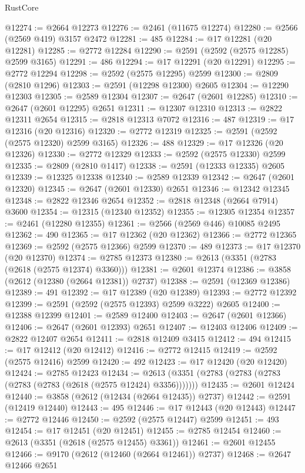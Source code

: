 \begin{lexlean}{RustCore}
\begin{coremodule}
@12274 := @2664 @12273
@12276 := @2461 (@11675 @12274)
@12280 := @2566 (@2569 @419) @3157 @2472
@12281 := 485
@12284 := @17 @12281 (@20 @12281)
@12285 := @2772 @12284
@12290 := @2591 (@2592 (@2575 @12285) @2599 @3165)
@12291 := 486
@12294 := @17 @12291 (@20 @12291)
@12295 := @2772 @12294
@12298 := @2592 (@2575 @12295) @2599
@12300 := @2809 (@2810 @1296)
@12303 := @2591 (@12298 @12300) @2605
@12304 := @12290 @12303
@12305 := @2589 @12304
@12307 := @2647 (@2601 @12285)
@12310 := @2647 (@2601 @12295) @2651
@12311 := @12307 @12310
@12313 := @2822 @12311 @2654
@12315 := @2818 @12313 @7072
@12316 := 487
@12319 := @17 @12316 (@20 @12316)
@12320 := @2772 @12319
@12325 := @2591 (@2592 (@2575 @12320) @2599 @3165)
@12326 := 488
@12329 := @17 @12326 (@20 @12326)
@12330 := @2772 @12329
@12333 := @2592 (@2575 @12330) @2599
@12335 := @2809 (@2810 @1417)
@12338 := @2591 (@12333 @12335) @2605
@12339 := @12325 @12338
@12340 := @2589 @12339
@12342 := @2647 (@2601 @12320)
@12345 := @2647 (@2601 @12330) @2651
@12346 := @12342 @12345
@12348 := @2822 @12346 @2654
@12352 := @2818 @12348 (@2664 @7914) @3600
@12354 := @12315 (@12340 @12352)
@12355 := @12305 @12354
@12357 := @2461 (@12280 @12355)
@12361 := @2566 (@2569 @446) @10085 @2495
@12362 := 490
@12365 := @17 @12362 (@20 @12362)
@12366 := @2772 @12365
@12369 := @2592 (@2575 @12366) @2599
@12370 := 489
@12373 := @17 @12370 (@20 @12370)
@12374 := @2785 @12373
@12380 := @2613 (@3351 (@2783 (@2618 (@2575 @12374) @3360)))
@12381 := @2601 @12374
@12386 := @3858 (@2612 (@12380 (@2664 @12381)) @2737)
@12388 := @2591 (@12369 @12386)
@12389 := 491
@12392 := @17 @12389 (@20 @12389)
@12393 := @2772 @12392
@12399 := @2591 (@2592 (@2575 @12393) @2599 @3222) @2605
@12400 := @12388 @12399
@12401 := @2589 @12400
@12403 := @2647 (@2601 @12366)
@12406 := @2647 (@2601 @12393) @2651
@12407 := @12403 @12406
@12409 := @2822 @12407 @2654
@12411 := @2818 @12409 @3415
@12412 := 494
@12415 := @17 @12412 (@20 @12412)
@12416 := @2772 @12415
@12419 := @2592 (@2575 @12416) @2599
@12420 := 492
@12423 := @17 @12420 (@20 @12420)
@12424 := @2785 @12423
@12434 := @2613 (@3351 (@2783 (@2783 (@2783 (@2783 (@2783 (@2618 (@2575 @12424) @3356)))))))
@12435 := @2601 @12424
@12440 := @3858 (@2612 (@12434 (@2664 @12435)) @2737)
@12442 := @2591 (@12419 @12440)
@12443 := 495
@12446 := @17 @12443 (@20 @12443)
@12447 := @2772 @12446
@12450 := @2592 (@2575 @12447) @2599
@12451 := 493
@12454 := @17 @12451 (@20 @12451)
@12455 := @2785 @12454
@12460 := @2613 (@3351 (@2618 (@2575 @12455) @3361))
@12461 := @2601 @12455
@12466 := @9170 (@2612 (@12460 (@2664 @12461)) @2737)
@12468 := @2647 @12466 @2651

\end{coremodule}
\end{lexlean}
